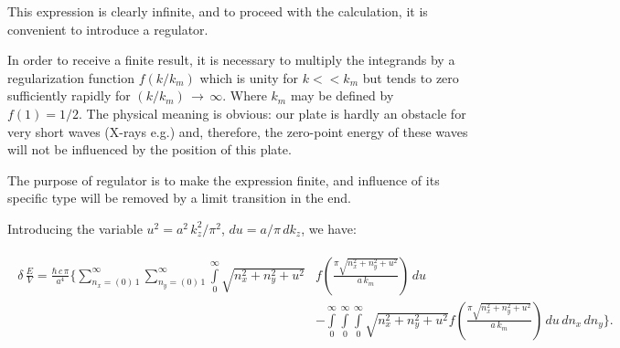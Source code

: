 \documentclass[twoside, 10pt]{article}
\begin{document}
\begin{multicols}{2}

    This expression is clearly infinite, and to proceed with the
calculation, it is convenient to introduce a regulator.

    In order to receive a finite result, it is necessary to multiply the
integrands by a regularization function \(f(k/k_m)\) which is unity for
\(k << k_m\) but tends to zero sufficiently rapidly for
\((k/k_m)\, \rightarrow\,\infty\). Where \(k_m\) may be defined by
\(f(1) = {1}/{2}\). The physical meaning is obvious: our plate is hardly an obstacle for very short
waves (X-rays e.g.) and, therefore, the zero-point energy of these waves will not be
influenced by the position of this plate.

    The purpose of regulator is to make the expression finite, and
influence of its specific type will be removed by a limit transition in the end.

    Introducing the variable \(u^2 = a^2\,k_z^2/\pi^2\),
\(du = a/\pi\,dk_z\), we have:
\end{multicols}
\vspace{-3.5mm}
    \begin{equation} \label{eq:3}
\begin{array}{c}
\begin{array}{ll}
\delta\,\frac{E}{V} =
\frac{\hbar\,c\,\pi}{a^4}\Bigg\{
\sum\limits_{n_x=\left(0\right)\,1}^{\infty}
\sum\limits_{n_y=\left(0\right)\,1}^{\infty}
\int\limits_{0}^{\infty}
{\sqrt{n_x^2 + n_y^2 + u^2}} &
f\left(\frac{\pi\sqrt{n_x^2 + n_y^2 + u^2}}{a\,k_m}\right)
\,d{u} \\
\, &- \int\limits_{0}^{\infty}
\int\limits_{0}^{\infty}
\int\limits_{0}^{\infty}
{\sqrt{n_x^2 + n_y^2 + u^2}}
f\left(\frac{\pi\sqrt{n_x^2 + n_y^2 + u^2}}{a\,k_m}\right)
\,d{u}\,d{n_x}\,d{n_y}
\Bigg\}.
\end{array}
\end{array}
\end{equation}
\vspace{-3.5mm}
\end{document}
